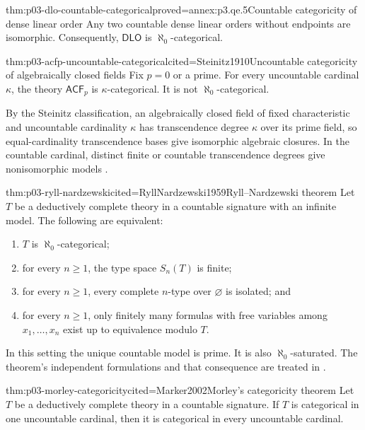 \begin{hbtheorem}{thm:p03-dlo-countable-categorical}{proved=annex:p3.qe.5}{Countable categoricity of dense linear order}
Any two countable dense linear orders without endpoints are isomorphic.
Consequently, \(\mathsf{DLO}\) is \(\aleph_0\)-categorical.
\end{hbtheorem}

\begin{hbtheorem}{thm:p03-acfp-uncountable-categorical}{cited=Steinitz1910}{Uncountable categoricity of algebraically closed fields}
Fix \(p=0\) or a prime.  For every uncountable cardinal \(\kappa\), the theory
\(\mathsf{ACF}_p\) is \(\kappa\)-categorical.  It is not
\(\aleph_0\)-categorical.
\end{hbtheorem}

By the Steinitz classification, an algebraically closed field of fixed
characteristic and uncountable cardinality \(\kappa\) has transcendence degree
\(\kappa\) over its prime field, so equal-cardinality transcendence bases give
isomorphic algebraic closures.  In the countable cardinal, distinct finite or
countable transcendence degrees give nonisomorphic models
\cite{Steinitz1910,Marker2002}.

\begin{hbtheorem}{thm:p03-ryll-nardzewski}{cited=RyllNardzewski1959}{Ryll--Nardzewski theorem}
Let \(T\) be a deductively complete theory in a countable signature with an
infinite model.  The following are equivalent:
\begin{enumerate}
  \item \(T\) is \(\aleph_0\)-categorical;
  \item for every \(n\geq1\), the type space \(S_n(T)\) is finite;
  \item for every \(n\geq1\), every complete \(n\)-type over
        \(\varnothing\) is isolated; and
  \item for every \(n\geq1\), only finitely many formulas with free variables
        among \(x_1,\ldots,x_n\) exist up to equivalence modulo \(T\).
\end{enumerate}
\end{hbtheorem}

In this setting the unique countable model is prime.  It is also
\(\aleph_0\)-saturated.  The theorem's independent formulations and that
consequence are treated in
\cite{RyllNardzewski1959,Engeler1959,Svenonius1959,Hodges1993,Marker2002}.

\begin{hbtheorem}{thm:p03-morley-categoricity}{cited=Marker2002}{Morley's categoricity theorem}
Let \(T\) be a deductively complete theory in a countable signature.  If
\(T\) is categorical in one uncountable cardinal, then it is categorical in
every uncountable cardinal.
\end{hbtheorem}

